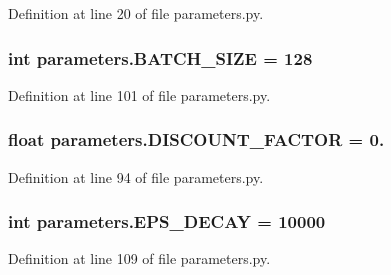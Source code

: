Definition at line 20 of file parameters.\+py.

\subsubsection[{\texorpdfstring{B\+A\+T\+C\+H\+\_\+\+S\+I\+ZE}{BATCH_SIZE}}]{\setlength{\rightskip}{0pt plus 5cm}int parameters.\+B\+A\+T\+C\+H\+\_\+\+S\+I\+ZE = 128}\hypertarget{namespaceparameters_a2d37d9950f7a887014021ab455282af6}{}\label{namespaceparameters_a2d37d9950f7a887014021ab455282af6}


Definition at line 101 of file parameters.\+py.

\subsubsection[{\texorpdfstring{D\+I\+S\+C\+O\+U\+N\+T\+\_\+\+F\+A\+C\+T\+OR}{DISCOUNT_FACTOR}}]{\setlength{\rightskip}{0pt plus 5cm}float parameters.\+D\+I\+S\+C\+O\+U\+N\+T\+\_\+\+F\+A\+C\+T\+OR = 0.}\hypertarget{namespaceparameters_a70176024e0f585c846365800f1c7819c}{}\label{namespaceparameters_a70176024e0f585c846365800f1c7819c}


Definition at line 94 of file parameters.\+py.

\subsubsection[{\texorpdfstring{E\+P\+S\+\_\+\+D\+E\+C\+AY}{EPS_DECAY}}]{\setlength{\rightskip}{0pt plus 5cm}int parameters.\+E\+P\+S\+\_\+\+D\+E\+C\+AY = 10000}\hypertarget{namespaceparameters_ab9a88c663385563b35331bbea5c4a74b}{}\label{namespaceparameters_ab9a88c663385563b35331bbea5c4a74b}


Definition at line 109 of file parameters.\+py.

